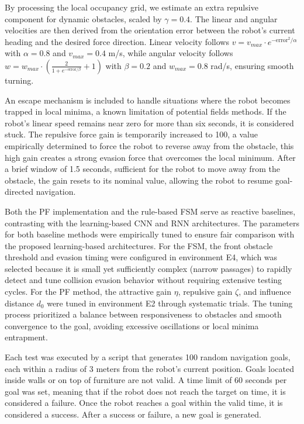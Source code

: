 \documentclass[robotics,article,submit,pdftex,moreauthors]{Definitions/mdpi}
\begin{document}
By processing the local occupancy grid, we estimate an extra repulsive component for dynamic obstacles, scaled by $\gamma = 0.4$. The linear and angular velocities are then derived from the orientation error between the robot's current heading and the desired force direction. Linear velocity follows $v = v_{max} \cdot e^{-\text{error}^2 / \alpha}$ with $\alpha = 0.8$ and $v_{max} = 0.4$ m/s, while angular velocity follows $w = w_{max} \cdot \left(\frac{2}{1 + e^{-\text{error}/\beta}} + 1\right)$ with $\beta = 0.2$ and $w_{max} = 0.8$ rad/s, ensuring smooth turning.

An escape mechanism is included to handle situations where the robot becomes trapped in local minima, a known limitation of potential fields methods. If the robot's linear speed remains near zero for more than six seconds, it is considered stuck. The repulsive force gain is temporarily increased to 100, a value empirically determined to force the robot to reverse away from the obstacle, this high gain creates a strong evasion force that overcomes the local minimum. After a brief window of 1.5 seconds, sufficient for the robot to move away from the obstacle, the gain resets to its nominal value, allowing the robot to resume goal-directed navigation.

Both the PF implementation and the rule-based FSM serve as reactive baselines, contrasting with the learning-based CNN and RNN architectures. The parameters for both baseline methods were empirically tuned to ensure fair comparison with the proposed learning-based architectures. For the FSM, the front obstacle threshold and evasion timing were configured in environment E4,  which was selected because it is small yet sufficiently complex (narrow passages) to rapidly detect and tune collision evasion behavior without requiring extensive testing cycles. For the PF method, the attractive gain $\eta$, repulsive gain $\zeta$, and influence distance $d_0$ were tuned in environment E2 through systematic trials. The tuning process prioritized a balance between responsiveness to obstacles and smooth convergence to the goal, avoiding excessive oscillations or local minima entrapment.

Each test was executed by a script that generates 100 random navigation goals, each within a radius of 3 meters from the robot's current position. Goals located inside walls or on top of furniture are not valid. A time limit of 60 seconds per goal was set, meaning that if the robot does not reach the target on time, it is considered a failure. Once the robot reaches a goal within the valid time, it is considered a success. After a success or failure, a new goal is generated.
\end{document}
